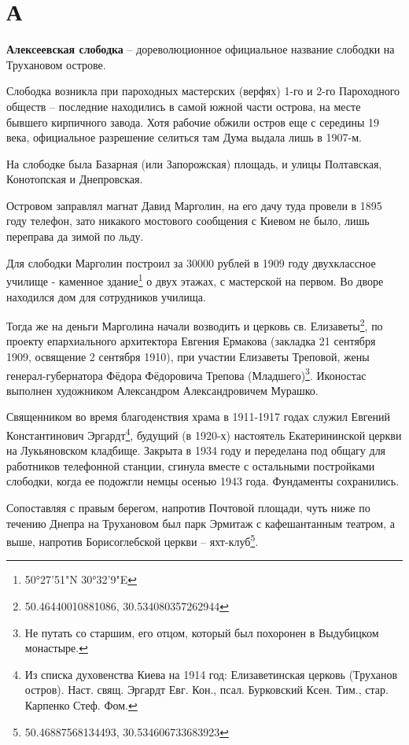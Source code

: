 \chapter*{А}

\textbf{Алексеевская слободка} –  дореволюционное официальное название слободки на Трухановом острове.

Слободка возникла при пароходных мастерских (верфях) 1-го и 2-го Пароходного обществ – последние находились в самой южной части острова, на месте бывшего кирпичного завода. Хотя рабочие обжили остров еще с середины 19 века, официальное разрешение селиться там Дума выдала лишь в 1907-м. 

На слободке была Базарная (или Запорожская) площадь, и улицы Полтавская, Конотопская и Днепровская.

Островом заправлял магнат Давид Марголин, на его дачу туда провели в 1895 году телефон, зато никакого мостового сообщения с Киевом не было, лишь переправа да зимой по льду.

Для слободки Марголин построил за 30000 рублей в 1909 году двухклассное училище - каменное здание\footnote{50°27'51"N 30°32'9"E} о двух этажах, с мастерской на первом. Во дворе находился дом для сотрудников училища.

Тогда же на деньги Марголина начали возводить и церковь св. Елизаветы\footnote{50.46440010881086, 30.534080357262944}, по проекту епархиального архитектора Евгения Ермакова (закладка 21 сентября 1909, освящение 2 сентября 1910), при участии Елизаветы Треповой, жены генерал-губернатора Фёдора Фёдоровича Трепова (Младшего)\footnote{Не путать со старшим, его отцом, который был похоронен в Выдубицком монастыре.}. Иконостас выполнен художником Александром Александровичем Мурашко. 

Священником во время благоденствия храма в 1911-1917 годах служил Евгений Константинович Эргардт\footnote{Из списка духовенства Киева на 1914 год: Елизаветинская церковь (Труханов остров). Наст. свящ. Эргардт Евг. Кон., псал. Бурковский Ксен. Тим., стар. Карпенко Стеф. Фом.}, будущий (в 1920-х) настоятель Екатерининской церкви на Лукьяновском кладбище. Закрыта в 1934 году и переделана под общагу для работников телефонной станции, сгинула вместе с остальными постройками слободки, когда ее подожгли немцы осенью 1943 года. Фундаменты сохранились.

Сопоставляя с правым берегом, напротив Почтовой площади, чуть ниже по течению Днепра на Трухановом был парк Эрмитаж с кафешантанным театром, а выше, напротив Борисоглебской церкви – яхт-клуб\footnote{50.46887568134493, 30.534606733683923}.\\

